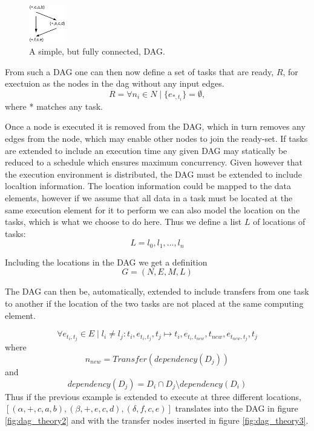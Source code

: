 \documentclass[preprint]{../PGAS10/sigplanconf}
\begin{document}
\begin{figure}
 \centering
 \includegraphics[width=60px]{gfx/dag_theory1}
 \caption{A simple, but fully connected, DAG.}
 \label{fig:dag_theory1}
\end{figure}


From such a DAG one can then now define a set of tasks that are ready, $R$, for exectuion as the nodes in the dag without any input edges.
\begin{equation*}
R = \forall n_i \in N \mid \{e_{*,t_i}\} = \emptyset,
\end{equation*}
where * matches any task.

Once a node is executed it is removed from the DAG, which in turn removes any edges from the node, which may enable other nodes to join the ready-set. If tasks are extended to include an execution time any given DAG may statically be reduced to a schedule which ensures maximum concurrency. Given however that the execution environment is distributed, the DAG must be extended to include localtion information. The location information could be mapped to the data elements, however if we assume that all data in a task must be located at the same execution element for it to perform we can also model the location on the tasks, which is what we choose to do here. Thus we define a list $L$ of locations of tasks:
\begin{equation*}
L={l_0,l_1,...,l_n}
\end{equation*}

Including the locations in the DAG we get a definition
\begin{equation*}
G=(N,E,M,L)
\end{equation*}


The DAG can then be, automatically, extended to include transfers from one task to another if the location of the two tasks are not placed at the same computing element.

\begin{equation*}
\forall e_{t_i,t_j} \in E \mid l_i \neq l_j : t_i,e_{t_i,t_j},t_j \mapsto t_i,e_{t_i,t_{new}},t_{new},e_{t_{new},t_j},t_j
\end{equation*}
where
\begin{equation*}
n_{new} = Transfer(dependency(D_j))
\end{equation*}
and
\begin{equation*}
dependency(D_j) = D_i \cap D_j \setminus dependency(D_i)
\end{equation*}
Thus if the previous example is extended to execute at three different locations, $[(\alpha,+,c,a,b),(\beta,+,e,c,d),(\delta, f,c,e)]$ translates into the DAG in figure \ref{fig:dag_theory2} and with the transfer nodes inserted in figure \ref{fig:dag_theory3}.
\end{document}
